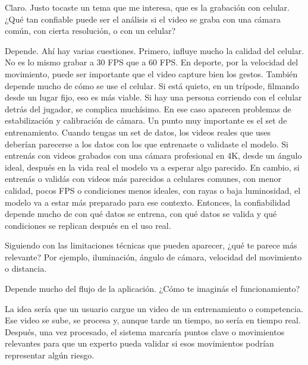 \begin{description}[leftmargin=0pt, itemindent=\parindent, labelsep=0.5em, itemsep=0pt, parsep=0pt, topsep=0pt]
    \item[\textbf{Entrevistador:}] Claro. Justo tocaste un tema que me interesa, que es la grabación con celular. ¿Qué tan confiable puede ser el análisis si el video se graba con una cámara común, con cierta resolución, o con un celular?

    \item[\textbf{Gonzalo Pereyra Metnyk:}] Depende. Ahí hay varias cuestiones. Primero, influye mucho la calidad del celular. No es lo mismo grabar a 30 FPS que a 60 FPS. En deporte, por la velocidad del movimiento, puede ser importante que el video capture bien los gestos. También depende mucho de cómo se use el celular. Si está quieto, en un trípode, filmando desde un lugar fijo, eso es más viable. Si hay una persona corriendo con el celular detrás del jugador, se complica muchísimo. En ese caso aparecen problemas de estabilización y calibración de cámara. Un punto muy importante es el set de entrenamiento. Cuando tengas un set de datos, los videos reales que uses deberían parecerse a los datos con los que entrenaste o validaste el modelo. Si entrenás con videos grabados con una cámara profesional en 4K, desde un ángulo ideal, después en la vida real el modelo va a esperar algo parecido. En cambio, si entrenás o validás con videos más parecidos a celulares comunes, con menor calidad, pocos FPS o condiciones menos ideales, con rayas o baja luminosidad, el modelo va a estar más preparado para ese contexto. Entonces, la confiabilidad depende mucho de con qué datos se entrena, con qué datos se valida y qué condiciones se replican después en el uso real.

    \item[\textbf{Entrevistador:}] Siguiendo con las limitaciones técnicas que pueden aparecer, ¿qué te parece más relevante? Por ejemplo, iluminación, ángulo de cámara, velocidad del movimiento o distancia.

    \item[\textbf{Gonzalo Pereyra Metnyk:}] Depende mucho del flujo de la aplicación. ¿Cómo te imaginás el funcionamiento?

    \item[\textbf{Entrevistador:}] La idea sería que un usuario cargue un video de un entrenamiento o competencia. Ese video se sube, se procesa y, aunque tarde un tiempo, no sería en tiempo real. Después, una vez procesado, el sistema marcaría puntos clave o movimientos relevantes para que un experto pueda validar si esos movimientos podrían representar algún riesgo.


\end{description}
